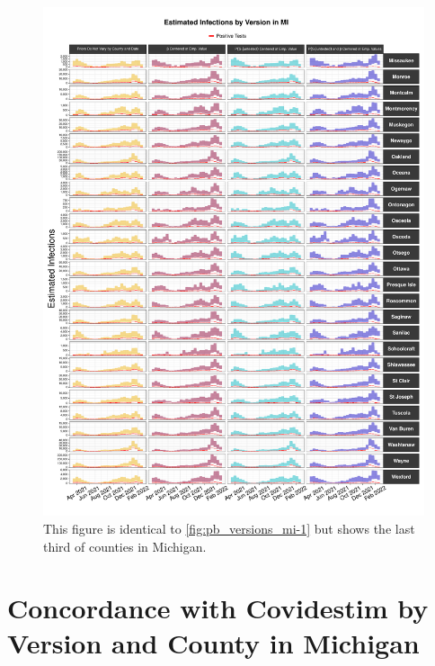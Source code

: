 \documentclass[12pt,twoside]{smiththesis}
\begin{document}
\begin{figure}

{\centering \includegraphics[width=1\linewidth]{figure/mi3_pb_compared_to_observed} 

}

\caption{\label{fig:pb_versions_mi-3} This figure is identical to \ref{fig:pb_versions_mi-1} but shows the last third of counties in Michigan.}\label{fig:unnamed-chunk-114}
\end{figure}
\hypertarget{concordance-with-covidestim-by-version-and-county-in-michigan}{%
\section{Concordance with Covidestim by Version and County in Michigan}\label{concordance-with-covidestim-by-version-and-county-in-michigan}}
\end{document}
